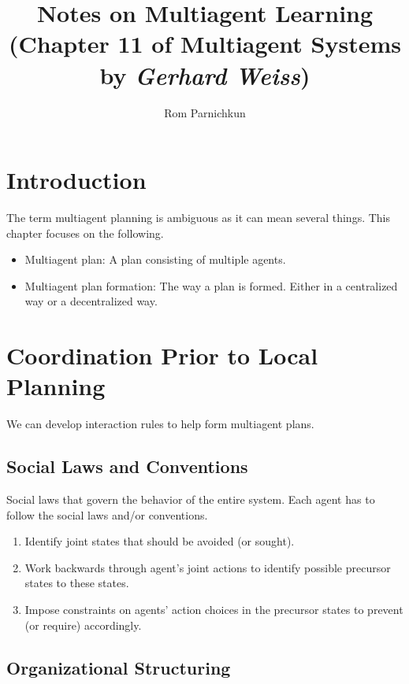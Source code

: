 \documentclass[twocolumn]{article}
\theoremstyle{plain}
\begin{document}
\title{Notes on \textbf{Multiagent Learning}\\\small{(Chapter 11 of Multiagent Systems by \textit{Gerhard Weiss})}}
\author{Rom Parnichkun}

\maketitle

\section{Introduction}

The term multiagent planning is ambiguous as it can mean several things. This chapter focuses on the following.
\begin{itemize}
    \item Multiagent plan: A plan consisting of multiple agents.
    \item Multiagent plan formation: The way a plan is formed. Either in a centralized way or a decentralized way.
\end{itemize}

\section{Coordination Prior to Local Planning}

We can develop interaction rules to help form multiagent plans.

\subsection{Social Laws and Conventions}

Social laws that govern the behavior of the entire system. Each agent has to follow the social laws and/or conventions.

\begin{enumerate}
    \item Identify joint states that should be avoided (or sought).
    \item Work backwards through agent's joint actions to identify possible precursor states to these states.
    \item Impose constraints on agents' action choices in the precursor states to prevent (or require) accordingly. 
\end{enumerate}

\subsection{Organizational Structuring}
\end{document}
